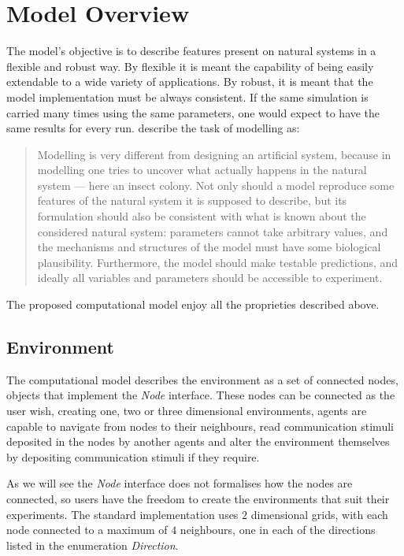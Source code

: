 
\chapter{Model Overview}
\label{ch:model-overview}

The model's objective is to describe features present on natural systems in a flexible and robust way. By flexible it is meant the capability of being easily extendable to a wide variety of applications. By robust, it is meant that the model implementation must be always consistent. If the same simulation is carried many times using the same parameters, one would expect to have the same results for every run. \citeauthor{bonabeau1999swarm} \cite{bonabeau1999swarm} describe the task of modelling as:

\begin{quote}
Modelling is very different from designing an artificial system, because in modelling one tries to uncover what actually happens in the natural system — here an insect colony. Not only should a model reproduce some features of the natural system it is supposed to describe, but its formulation should also be consistent with what is known about the considered natural system: parameters cannot take arbitrary values, and the mechanisms and structures of the model must have some biological plausibility. Furthermore, the model should make testable predictions, and ideally all variables and parameters should be accessible to experiment.
\end{quote}

The proposed computational model enjoy all the proprieties described above.

\section{Environment}

The computational model describes the environment as a set of connected nodes, objects that implement the \emph{Node} interface. These nodes can be connected as the user wish, creating one, two or three dimensional environments, agents are capable to navigate from nodes to their neighbours, read communication stimuli deposited in the nodes by another agents and alter the environment themselves by depositing communication stimuli if they require.

As we will see the \emph{Node} interface does not formalises how the nodes are connected, so users have the freedom to create the environments that suit their experiments. The standard implementation uses $2$ dimensional grids, with each node connected to a maximum of $4$ neighbours, one in each of the directions listed in the enumeration \emph{Direction}.

